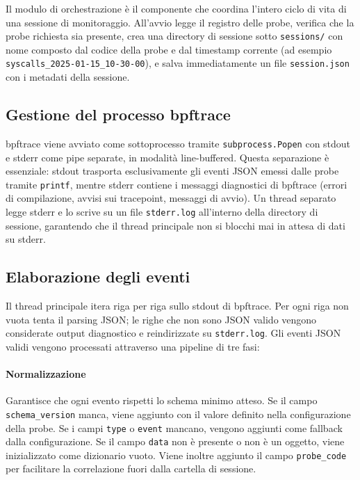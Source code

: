 Il modulo di orchestrazione è il componente che coordina l'intero ciclo di vita di una sessione di monitoraggio. All'avvio legge il registro delle probe, verifica che la probe richiesta sia presente, crea una directory di sessione sotto \texttt{sessions/} con nome composto dal codice della probe e dal timestamp corrente (ad esempio \texttt{syscalls\_2025-01-15\_10-30-00}), e salva immediatamente un file \texttt{session.json} con i metadati della sessione.

\subsection{Gestione del processo bpftrace}

bpftrace viene avviato come sottoprocesso tramite \texttt{subprocess.Popen} con stdout e stderr come pipe separate, in modalità line-buffered. Questa separazione è essenziale: stdout trasporta esclusivamente gli eventi JSON emessi dalle probe tramite \texttt{printf}, mentre stderr contiene i messaggi diagnostici di bpftrace (errori di compilazione, avvisi sui tracepoint, messaggi di avvio). Un thread separato legge stderr e lo scrive su un file \texttt{stderr.log} all'interno della directory di sessione, garantendo che il thread principale non si blocchi mai in attesa di dati su stderr.

\subsection{Elaborazione degli eventi}

Il thread principale itera riga per riga sullo stdout di bpftrace. Per ogni riga non vuota tenta il parsing JSON; le righe che non sono JSON valido vengono considerate output diagnostico e reindirizzate su \texttt{stderr.log}. Gli eventi JSON validi vengono processati attraverso una pipeline di tre fasi:

\paragraph{Normalizzazione} Garantisce che ogni evento rispetti lo schema minimo atteso. Se il campo \texttt{schema\_version} manca, viene aggiunto con il valore definito nella configurazione della probe. Se i campi \texttt{type} o \texttt{event} mancano, vengono aggiunti come fallback dalla configurazione. Se il campo \texttt{data} non è presente o non è un oggetto, viene inizializzato come dizionario vuoto. Viene inoltre aggiunto il campo \texttt{probe\_code} per facilitare la correlazione fuori dalla cartella di sessione.

